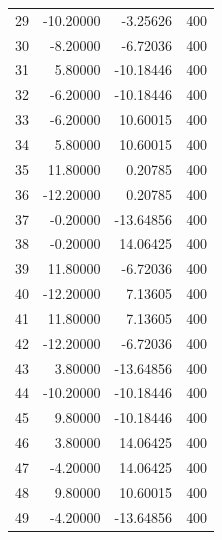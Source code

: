 \begin{longtable}{rrrr}
29 & -10.20000 & -3.25626 & 400 \\
30 & -8.20000 & -6.72036 & 400 \\
31 & 5.80000 & -10.18446 & 400 \\
32 & -6.20000 & -10.18446 & 400 \\
33 & -6.20000 & 10.60015 & 400 \\
34 & 5.80000 & 10.60015 & 400 \\
35 & 11.80000 & 0.20785 & 400 \\
36 & -12.20000 & 0.20785 & 400 \\
37 & -0.20000 & -13.64856 & 400 \\
38 & -0.20000 & 14.06425 & 400 \\
39 & 11.80000 & -6.72036 & 400 \\
40 & -12.20000 & 7.13605 & 400 \\
41 & 11.80000 & 7.13605 & 400 \\
42 & -12.20000 & -6.72036 & 400 \\
43 & 3.80000 & -13.64856 & 400 \\
44 & -10.20000 & -10.18446 & 400 \\
45 & 9.80000 & -10.18446 & 400 \\
46 & 3.80000 & 14.06425 & 400 \\
47 & -4.20000 & 14.06425 & 400 \\
48 & 9.80000 & 10.60015 & 400 \\
49 & -4.20000 & -13.64856 & 400 \\
\bottomrule
\end{longtable}


